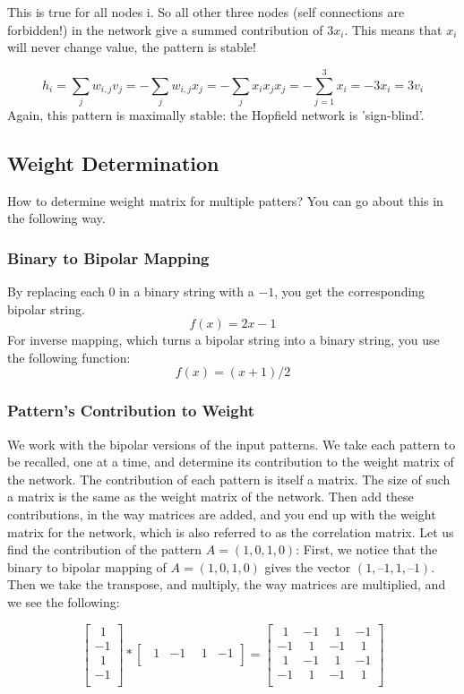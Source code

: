 \documentclass[12pt, right open]{memoir}
\newcommand{\matplus}{
~~
  }
\begin{document}
This is true for all nodes i. So all other three nodes (self connections are
forbidden!) in the network give a summed contribution of $3x_i$. This means that $x_i$ will never change value, the pattern is stable!

\[
h_i = \sum_j w_{i,j}v_j = - \sum_j w_{i,j}x_j = - \sum_j x_ix_jx_j = -\sum^3_{j=1} x_i = −3x_i = 3v_i
\]
Again, this pattern is maximally stable: the Hopfield network is ’sign-blind’.

\subsection{Weight Determination}
How to determine weight matrix for multiple patters? You can go about this in the following way.
\subsubsection{Binary to Bipolar Mapping}
By replacing each $0$ in a binary string with a $-1$, you get the corresponding bipolar string.
\[
f(x) = 2x - 1
\]
For inverse mapping, which turns a bipolar string into a binary string, you use
the following function:
\[
f(x) = (x + 1) / 2
\]
\subsubsection{Pattern’s Contribution to Weight}
We work with the bipolar versions of the input patterns. We take each
pattern to be recalled, one at a time, and determine its contribution to the
weight matrix of the network. The contribution of each pattern is itself a
matrix. The size of such a matrix is the same as the weight matrix of the
network. Then add these contributions, in the way matrices are added, and you
end up with the weight matrix for the network, which is also referred to as the
correlation matrix. Let us find the contribution of the pattern $A = (1, 0, 1, 0)$:
First, we notice that the binary to bipolar mapping of $A = (1, 0, 1, 0)$ gives the
vector $(1, –1, 1, –1)$.
Then we take the transpose, and multiply, the way matrices are multiplied, and
we see the following:

\[ 
\begin{bmatrix}
\matplus1  \\
-1  \\
\matplus1  \\
-1  \\
\end{bmatrix}
*
\begin{bmatrix}
 \matplus1 & -1 & \matplus1 & -1  \\
\end{bmatrix}
=
\begin{bmatrix}
 \matplus1 & -1 &  \matplus1 & -1 \\
-1 &  \matplus1 & -1 &  \matplus1 \\
 \matplus1 & -1 &  \matplus1 & -1 \\
-1 & \matplus1 & -1 &  \matplus1 \\
\end{bmatrix}
\]
\end{document}
